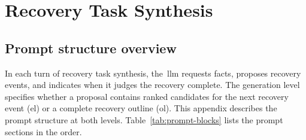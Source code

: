 
\section{Recovery Task Synthesis}\label{sec:outline}

\subsection{Prompt structure overview}\label{sec:prompt-overview}

In each turn of recovery task synthesis, the~\gls{llm} requests facts, proposes recovery events, and indicates when it judges the recovery complete. The generation level specifies whether a proposal contains ranked candidates for the next recovery event (\gls{el}) or a complete recovery outline (\gls{ol}). This appendix describes the prompt structure at both levels. Table~\ref{tab:prompt-blocks} lists the prompt sections in the order.


